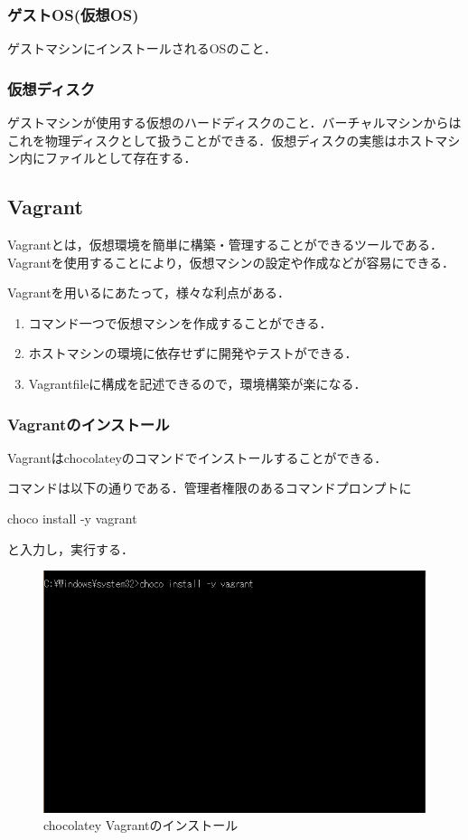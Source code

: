\subsubsection{ゲストOS(仮想OS)}

ゲストマシンにインストールされるOSのこと．

\subsubsection{仮想ディスク}

ゲストマシンが使用する仮想のハードディスクのこと．バーチャルマシンからはこれを物理ディスクとして扱うことができる．仮想ディスクの実態はホストマシン内にファイルとして存在する．
\newpage

\subsection{Vagrant}
Vagrantとは，仮想環境を簡単に構築・管理することができるツールである．Vagrantを使用することにより，仮想マシンの設定や作成などが容易にできる．

Vagrantを用いるにあたって，様々な利点がある．
\begin{enumerate}
 \item コマンド一つで仮想マシンを作成することができる．
 \item ホストマシンの環境に依存せずに開発やテストができる．
 \item Vagrantfileに構成を記述できるので，環境構築が楽になる．
 \end{enumerate}
\newpage

\subsubsection{Vagrantのインストール}
Vagrantはchocolateyのコマンドでインストールすることができる．

コマンドは以下の通りである．管理者権限のあるコマンドプロンプトに

choco install -y vagrant 

と入力し，実行する．

\begin{figure}[htb]
\centering
\includegraphics[width=13cm]{4-8.png}
\caption{chocolatey Vagrantのインストール}\label{4-8}
\end{figure}
\newpage

